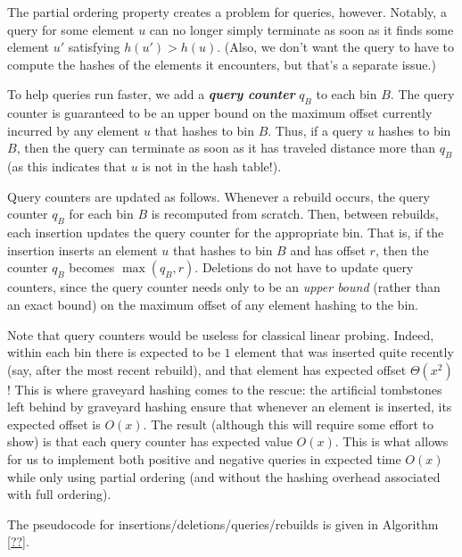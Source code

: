 \documentclass[10pt]{article}
\theoremstyle{remark}
\theoremstyle{remark}
\newcommand{\defn}[1]{\textbf{\emph{#1}}}
\begin{document}
The partial ordering property creates a problem for queries, however. Notably, a query for some element $u$ can no longer simply terminate as soon as it finds some element $u'$ satisfying $h(u') > h(u)$. (Also, we don't want the query to have to compute the hashes of the elements it encounters, but that's a separate issue.) 

To help queries run faster, we add a \defn{query counter} $q_B$ to each bin $B$. The query counter is guaranteed to be an upper bound on the maximum offset currently incurred by any element $u$ that hashes to bin $B$. Thus, if a query $u$ hashes to bin $B$, then the query can terminate as soon as it has traveled distance more than $q_B$ (as this indicates that $u$ is not in the hash table!). 

Query counters are updated as follows. Whenever a rebuild occurs, the query counter $q_B$ for each bin $B$ is recomputed from scratch. Then, between rebuilds, each insertion updates the query counter for the appropriate bin. That is, if the insertion inserts an element $u$ that hashes to bin $B$ and has offset $r$, then the counter $q_B$ becomes $\max(q_B, r)$. Deletions do not have to update query counters, since the query counter needs only to be an \emph{upper bound} (rather than an exact bound) on the maximum 
offset of any element hashing to the bin. 

Note that query counters would be useless for classical linear probing. Indeed, within each bin there is expected to be $1$ element that was inserted quite recently (say, after the most recent rebuild), and that element has expected offset $\Theta(x^2)$! This is where graveyard hashing comes to the rescue: the artificial tombstones left behind by graveyard hashing ensure that whenever an element is inserted, its expected offset is $O(x)$. The result (although this will require some effort to show) is that each query counter has expected value $O(x)$. This is what allows for us to implement both positive and negative queries in expected time $O(x)$ while only using partial ordering (and without the hashing overhead associated with full ordering).

The pseudocode for insertions/deletions/queries/rebuilds is given in Algorithm \ref{??}.
\end{document}
